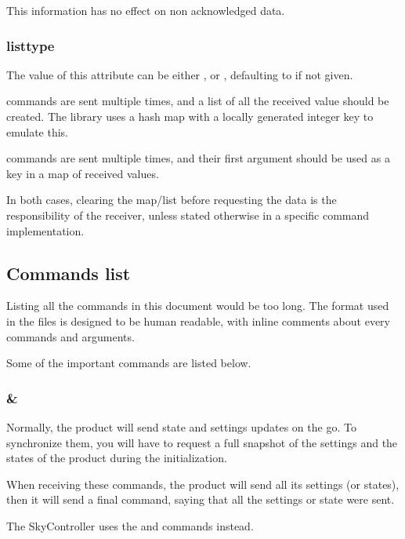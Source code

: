 This information has no effect on non acknowledged data.

\subsubsection{listtype}

The value of this attribute can be either ,  or , defaulting to  if not given.

 commands are sent multiple times, and a list of all the received value should be created. The  library uses a hash map with a locally generated integer key to emulate this.

 commands are sent multiple times, and their first argument should be used as a key in a map of received values.

In both cases, clearing the map/list before requesting the data is the responsibility of the receiver, unless stated otherwise in a specific command implementation.

\subsection{Commands list}

Listing all the commands in this document would be too long. The format used in the  files is designed to be human readable, with inline comments about every commands and arguments.

Some of the important commands are listed below.

\subsubsection{ \&\\}

Normally, the product will send state and settings updates on the go. To synchronize them, you will have to request a full snapshot of the settings and the states of the product during the initialization.

When receiving these commands, the product will send all its settings (or states), then it will send a final command, saying that all the settings or state were sent.

The SkyController uses the  and  commands instead.

